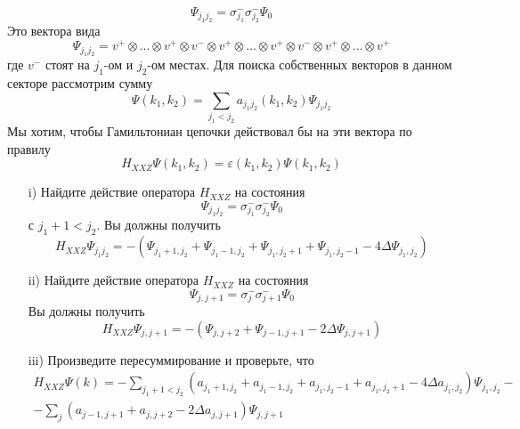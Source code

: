 \documentclass[12pt]{article}
\theoremstyle{definition}
\begin{document}
\begin{enumerate}
    \begin{equation}
        \Psi_{j_1j_2}=\sigma^-_{j_1}\sigma^-_{j_2}\Psi_0
    \end{equation}
    Это вектора вида
    \begin{equation}
        \Psi_{j_1j_2}=v^+\otimes...\otimes v^+\otimes v^-\otimes v^+\otimes...\otimes v^+\otimes v^-\otimes v^+\otimes...\otimes v^+
    \end{equation}
    где $v^-$ стоят на $j_1$-ом и $j_2$-ом местах. Для поиска собственных векторов в данном секторе рассмотрим сумму
    \begin{equation}
        \Psi(k_1,k_2)=\sum\limits_{j_1<j_2}a_{j_1j_2}(k_1,k_2)\Psi_{j_1j_2}
    \end{equation}
    Мы хотим, чтобы Гамильтониан цепочки действовал бы на эти вектора по правилу
    \begin{equation}
        H_{XXZ}\Psi(k_1,k_2)=\varepsilon(k_1,k_2)\Psi(k_1,k_2)
    \end{equation}
    \begin{itemize}
        \item[i)] Найдите действие оператора $H_{XXZ}$ на состояния
        \begin{equation}
            \Psi_{j_1j_2}=\sigma^-_{j_1}\sigma^-_{j_2}\Psi_0
        \end{equation}
        с $j_1+1<j_2$. Вы должны получить
        \begin{equation}
            H_{XXZ}\Psi_{j_1j_2}=-(\Psi_{j_1+1,j_2}+\Psi_{j_1-1,j_2}+\Psi_{j_1,j_2+1}+\Psi_{j_1,j_2-1}-4\Delta\Psi_{j_1,j_2})
        \end{equation}
        \item[ii)] Найдите действие оператора $H_{XXZ}$ на состояния
        \begin{equation}
            \Psi_{j,j+1}=\sigma^-_j\sigma^-_{j+1}\Psi_0
        \end{equation}
        Вы должны получить
        \begin{equation}
            H_{XXZ}\Psi_{j,j+1}=-(\Psi_{j,j+2}+\Psi_{j-1,j+1}-2\Delta\Psi_{j,j+1})
        \end{equation}
        \item[iii)] Произведите пересуммирование и проверьте, что
        \begin{multline}
            H_{XXZ}\Psi(k)=-\sum\limits_{j_1+1<j_2}(a_{j_1+1,j_2}+a_{j_1-1,j_2}+a_{j_1,j_2-1}+a_{j_1,j_2+1}-4\Delta a_{j_1,j_2})\Psi_{j_1,j_2}-\\-\sum\limits_j(a_{j-1,j+1}+a_{j,j+2}-2\Delta a_{j,j+1})\Psi_{j,j+1}

\end{multline}
\end{itemize}
\end{enumerate}
\end{document}

